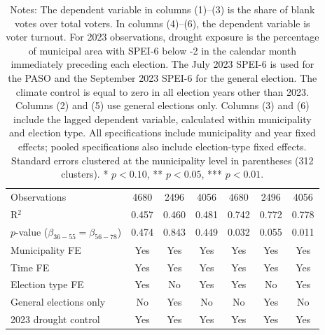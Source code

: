 \begin{table}[!h]
\begin{tabular}[t]{lcccccc}
\addlinespace
Observations & 4680 & 2496 & 4056 & 4680 & 2496 & 4056\\
R$^2$ & 0.457 & 0.460 & 0.481 & 0.742 & 0.772 & 0.778\\
$p$-value ($\beta_{36{-}55} = \beta_{56{-}78}$) & 0.474 & 0.843 & 0.449 & 0.032 & 0.055 & 0.011\\
Municipality FE & Yes & Yes & Yes & Yes & Yes & Yes\\
Time FE & Yes & Yes & Yes & Yes & Yes & Yes\\
Election type FE & Yes & No & Yes & Yes & No & Yes\\
General elections only & No & Yes & No & No & Yes & No\\
2023 drought control & Yes & Yes & Yes & Yes & Yes & Yes\\
\hline
\end{tabular}
\vspace{0.3em}
\captionsetup{justification=justified, singlelinecheck=false}
\caption*{\footnotesize Notes: The dependent variable in columns (1)--(3) is the share of blank votes over total voters. In columns (4)--(6), the dependent variable is voter turnout. For 2023 observations, drought exposure is the percentage of municipal area with SPEI-6 below -2 in the calendar month immediately preceding each election. The July 2023 SPEI-6 is used for the PASO and the September 2023 SPEI-6 for the general election. The climate control is equal to zero in all election years other than 2023. Columns (2) and (5) use general elections only. Columns (3) and (6) include the lagged dependent variable, calculated within municipality and election type. All specifications include municipality and year fixed effects; pooled specifications also include election-type fixed effects. Standard errors clustered at the municipality level in parentheses (312 clusters). * $p<0.10$, ** $p<0.05$, *** $p<0.01$.}
\end{table}
